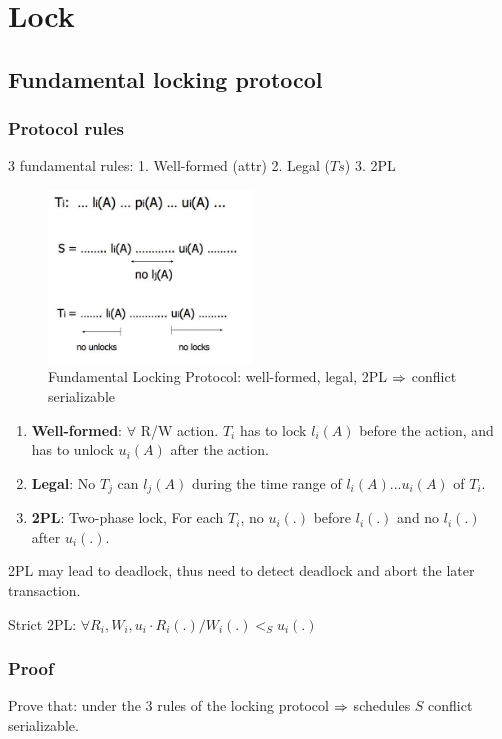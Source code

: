 \documentclass[a4paper]{report}
\begin{document}
\section{Lock}
\subsection{Fundamental locking protocol}
\subsubsection{Protocol rules}
3 fundamental rules: 1. Well-formed (attr) 2. Legal ($Ts$) 3. 2PL
\begin{figure}[H]
    \centerline{\includegraphics[height = 1.8in]{img/lockFundamental}}
    \caption{Fundamental Locking Protocol: well-formed, legal, 2PL $\Rightarrow$ conflict serializable}
  \label{fig:fundamentalLockingProtocol}
\end{figure}
\begin{enumerate}
\item \textbf{Well-formed}: $\forall$ R/W action. $T_i$ has to lock $l_i(A)$ before the action, and has to unlock $u_i(A)$ after the action.
\item \textbf{Legal}: No $T_j$ can $l_j(A)$ during the time range of $l_i(A) ... u_i(A)$ of $T_i$.
\item \textbf{2PL}: Two-phase lock, For each $T_i$, no $u_i(.)$ before $l_i(.)$ and no $l_i(.)$ after $u_i(.)$. 
\end{enumerate}

2PL may lead to deadlock, thus need to detect deadlock and abort the later transaction.

Strict 2PL: $\forall R_i, W_i, u_i \cdot R_i(.)/W_i(.) <_S u_i(.) $

\subsubsection{Proof}
Prove that: under the 3 rules of the locking protocol $\Rightarrow$ schedules $S$ conflict serializable. 
\end{document}
